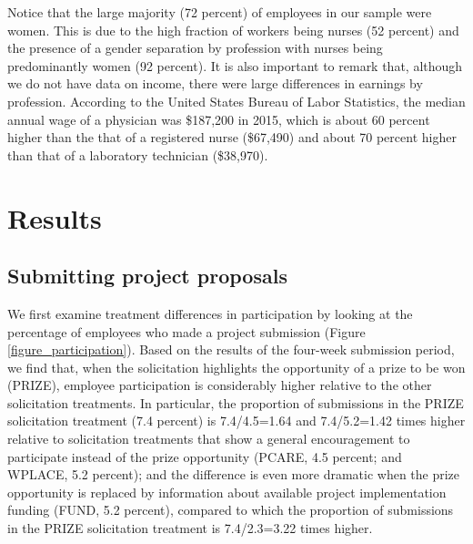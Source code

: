 \documentclass[11pt, titlepage]{article}
\begin{document}
Notice that the large majority (72 percent) of employees in our sample
were women. This is due to the high fraction of workers being nurses (52
percent) and the presence of a gender separation by profession with
nurses being predominantly women (92 percent). It is also important to
remark that, although we do not have data on income, there were large
differences in earnings by profession. According to the United States
Bureau of Labor Statistics, the median annual wage of a physician was
\$187,200 in 2015, which is about 60 percent higher than the that of a
registered nurse (\$67,490) and about 70 percent higher than that of a
laboratory technician (\$38,970).

\clearpage

\section{Results}\label{results}

\subsection{Submitting project
proposals}\label{submitting-project-proposals}

We first examine treatment differences in participation by looking at
the percentage of employees who made a project submission (Figure
\ref{figure_participation}). Based on the results of the four-week
submission period, we find that, when the solicitation highlights the
opportunity of a prize to be won (PRIZE), employee participation is
considerably higher relative to the other solicitation treatments. In
particular, the proportion of submissions in the PRIZE solicitation
treatment (7.4 percent) is 7.4/4.5=1.64 and 7.4/5.2=1.42 times higher
relative to solicitation treatments that show a general encouragement to
participate instead of the prize opportunity (PCARE, 4.5 percent; and
WPLACE, 5.2 percent); and the difference is even more dramatic when the
prize opportunity is replaced by information about available project
implementation funding (FUND, 5.2 percent), compared to which the
proportion of submissions in the PRIZE solicitation treatment is
7.4/2.3=3.22 times higher.
\end{document}
